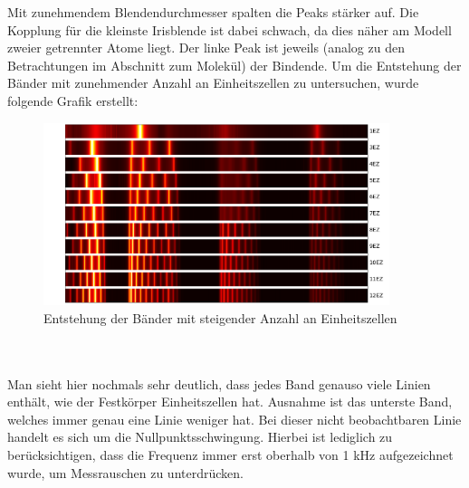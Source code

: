 \documentclass[german,  %
parskip=full,  %
]{scrartcl}
\begin{document}
Mit zunehmendem Blendendurchmesser spalten die Peaks stärker auf. Die Kopplung für die kleinste Irisblende ist dabei schwach, da dies näher am Modell zweier getrennter Atome liegt. Der linke Peak ist jeweils (analog zu den Betrachtungen im Abschnitt zum Molekül) der Bindende.
Um die Entstehung der Bänder mit zunehmender Anzahl an Einheitszellen zu untersuchen, wurde folgende Grafik erstellt:
\begin{figure}[h!]
\centering
\includegraphics[width=0.9\textwidth]{4624_Entstehung_der_Baender.png}
\caption{Entstehung der Bänder mit steigender Anzahl an Einheitszellen}
\end{figure}
\\\\
Man sieht hier nochmals sehr deutlich, dass jedes Band genauso viele Linien enthält, wie der Festkörper Einheitszellen hat. Ausnahme ist das unterste Band, welches immer genau eine Linie weniger hat. Bei dieser nicht beobachtbaren Linie handelt es sich um die Nullpunktsschwingung. Hierbei ist lediglich zu berücksichtigen, dass die Frequenz immer erst oberhalb von 1 kHz aufgezeichnet wurde, um Messrauschen zu unterdrücken.
\end{document}
